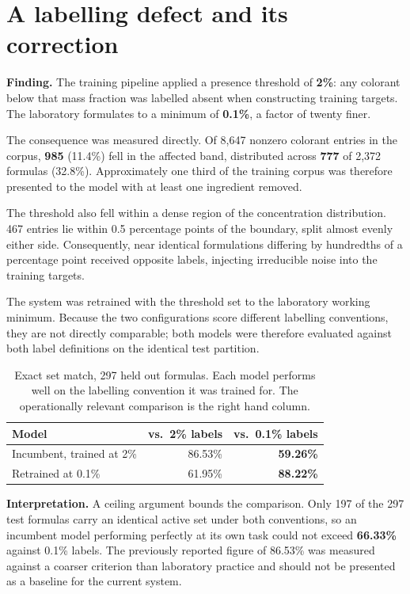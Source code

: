 \documentclass[11pt,a4paper]{article}
\newcommand{\keyfig}[1]{\textcolor{accent}{\textbf{#1}}}
\newcommand{\calloutcolour}{softbg}
\newenvironment{callout}[1][softbg]
  {\renewcommand{\calloutcolour}{#1}%
   \begin{lrbox}{\calloutbox}%
   \begin{minipage}{\dimexpr\textwidth-2\fboxsep-2\fboxrule\relax}%
   \vspace{2pt}}
  {\vspace{2pt}%
   \end{minipage}%
   \end{lrbox}%
   \begin{center}\colorbox{\calloutcolour}{\usebox{\calloutbox}}\end{center}}
\begin{document}
\section{A labelling defect and its correction}

\begin{callout}[warnbg]
\textbf{Finding.} The training pipeline applied a presence threshold of
\keyfig{2\%}: any colorant below that mass fraction was labelled absent when
constructing training targets. The laboratory formulates to a minimum of
\keyfig{0.1\%}, a factor of twenty finer.
\end{callout}

The consequence was measured directly. Of 8{,}647 nonzero colorant entries in the
corpus, \keyfig{985} (11.4\%) fell in the affected band, distributed across
\keyfig{777} of 2{,}372 formulas (32.8\%). Approximately one third of the training
corpus was therefore presented to the model with at least one ingredient removed.

The threshold also fell within a dense region of the concentration distribution.
467 entries lie within 0.5 percentage points of the boundary, split almost evenly
either side. Consequently, near identical formulations differing by hundredths of
a percentage point received opposite labels, injecting irreducible noise into the
training targets.

The system was retrained with the threshold set to the laboratory working minimum.
Because the two configurations score different labelling conventions, they are not
directly comparable; both models were therefore evaluated against both label
definitions on the identical test partition.

\begin{table}[h]
\centering
\begin{tabular}{lrr}
\toprule
Model & vs.\ 2\% labels & vs.\ 0.1\% labels \\
\midrule
Incumbent, trained at 2\%   & 86.53\% & \textbf{59.26\%} \\
Retrained at 0.1\%          & 61.95\% & \textbf{88.22\%} \\
\bottomrule
\end{tabular}
\caption{Exact set match, 297 held out formulas. Each model performs well on the
labelling convention it was trained for. The operationally relevant comparison is
the right hand column.}
\end{table}

\begin{callout}
\textbf{Interpretation.} A ceiling argument bounds the comparison. Only 197 of the
297 test formulas carry an identical active set under both conventions, so an
incumbent model performing perfectly at its own task could not exceed
\keyfig{66.33\%} against 0.1\% labels. The previously reported figure of 86.53\%
was measured against a coarser criterion than laboratory practice and should not
be presented as a baseline for the current system.
\end{callout}
\end{document}
